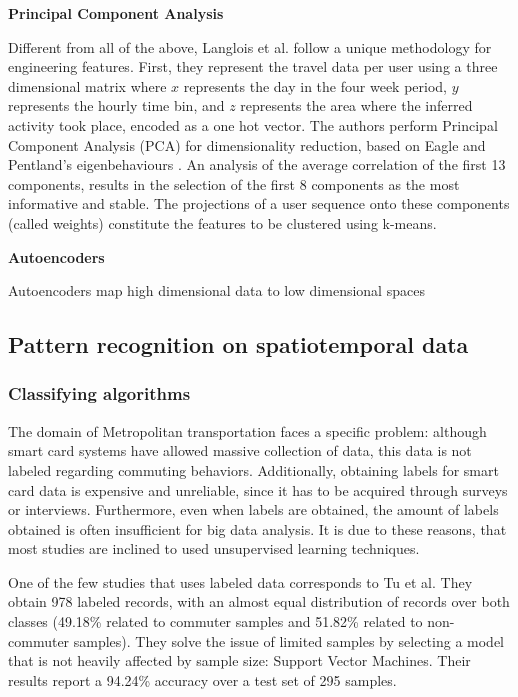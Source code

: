 \documentclass{article}
\begin{document}
\textbf{Principal Component Analysis}

Different from all of the above, Langlois et al. follow a unique methodology for engineering features. First, they represent the travel data per user using a three dimensional matrix where $x$ represents the day in the four week period, $y$ represents the hourly time bin, and $z$ represents the area where the inferred activity took place, encoded as a one hot vector. The authors perform Principal Component Analysis (PCA) for dimensionality reduction, based on Eagle and Pentland's eigenbehaviours \cite{eagle2009eigenbehaviors}. An analysis of the average correlation of the first 13 components, results in the selection of the first 8 components as the most informative and stable. The projections of a user sequence onto these components (called weights) constitute the features to be clustered using k-means. \cite{langlois2016inferring}

\textbf{Autoencoders}

Autoencoders map high dimensional data to low dimensional spaces 


\subsection{Pattern recognition on spatiotemporal data}

\subsubsection{Classifying algorithms}
The domain of Metropolitan transportation faces a specific problem: although smart card systems have allowed massive collection of data, this data is not labeled regarding commuting behaviors. Additionally, obtaining labels for smart card data is expensive and unreliable, since it has to be acquired through surveys or interviews. Furthermore, even when labels are obtained, the amount of labels obtained is often insufficient for big data analysis. It is due to these reasons, that most studies are inclined to used unsupervised learning techniques. 

One of the few studies that uses labeled data corresponds to Tu et al. They obtain 978 labeled records, with an almost equal distribution of records over both classes (49.18\% related to commuter samples and 51.82\% related to non-commuter samples). They solve the issue of limited samples by selecting a model that is not heavily affected by sample size: Support Vector Machines. Their results report a 94.24\% accuracy over a test set of 295 samples. 
\end{document}
